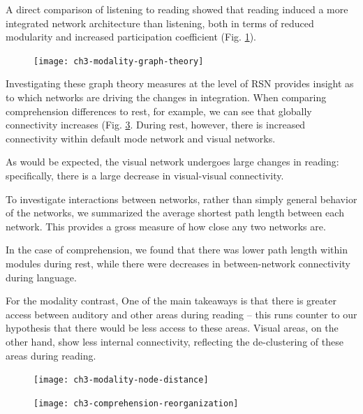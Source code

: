 A direct comparison of listening to reading showed that reading induced a more integrated network architecture than listening, both in terms of reduced modularity and increased participation coefficient (Fig. \ref{fig:ch3-modality-graph-theory}).

\begin{figure}[t]
	\centering
	\texttt{[image: ch3-modality-graph-theory]}
    \caption[Reading is more integrated than listening.]{}
	\label{fig:ch3-modality-graph-theory}
\end{figure}

Investigating these graph theory measures at the level of RSN provides  insight as to which networks are driving the changes in integration. When comparing comprehension differences to rest, for example, we can see that globally connectivity increases (Fig. \ref{fig:ch3-comprehension-reorganization}. During rest, however, there is increased connectivity within default mode network and visual networks.

As would be expected, the visual network undergoes large changes in reading: specifically, there is a large decrease in visual-visual connectivity. 

To investigate interactions between networks, rather than simply general behavior of the networks, we summarized the average shortest path length between each network. This provides a gross measure of how close any two networks are. 

In the case of comprehension, we found that there was lower path length within modules during rest, while there were decreases in between-network connectivity during language.

For the modality contrast, One of the main takeaways is that there is greater access between auditory and other areas during reading -- this runs counter to our hypothesis that there would be less access to these areas. Visual areas, on the other hand, show less internal connectivity, reflecting the de-clustering of these areas during reading. 

\begin{figure}[t]
	\centering
	\texttt{[image: ch3-modality-node-distance]}
    \caption[Summary of the change in distance between nodes during reading and listening.]{}
	\label{fig:ch3-comprehension-reorganization}
\end{figure}

\begin{figure}[t]
	\centering
	\texttt{[image: ch3-comprehension-reorganization]}
    \caption[Language increases between-network connectivity.]{}
	\label{fig:ch3-comprehension-reorganization}
\end{figure}


